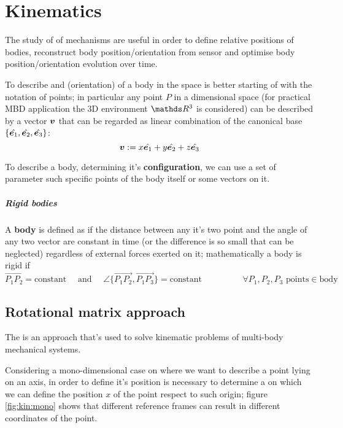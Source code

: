 \chapter{Kinematics}
	The study of  of mechanisms are useful in order to define relative positions of bodies, reconstruct body position/orientation from sensor and optimise body position/orientation evolution over time.
	
	To describe  and  (orientation) of a body in the space is better starting of with the notation of points; in particular any point $P$ in a dimensional space (for practical MBD application the 3D environment $\R^3$ is considered) can be described by a vector $\boldsymbol{v}$ that can be regarded as linear combination of the canonical base $\{\hat{\boldsymbol{e}_1},\hat{\boldsymbol{e}_2},\hat{\boldsymbol{e}_3}\}$:
	\begin{equation}
		\boldsymbol{v} := x \hat{\boldsymbol{e}_1} + y \hat{\boldsymbol{e}_2} + z \hat{\boldsymbol{e}_3}
	\end{equation}

	To describe a body, determining it's \textbf{configuration}, we can use a set of parameter such specific points of the body itself or some vectors on it.
	
	\paragraph{Rigid bodies} A \textbf{body} is defined as  if the distance between any it's two point and the angle of any two vector are constant in time (or the difference is so small that can be neglected) regardless of external forces exerted on it; mathematically a body is rigid if
	\begin{equation}
		\overrightarrow{P_1P_2} = \textrm{constant} \quad \textrm{ and } \quad \angle \{ \overrightarrow{P_1P_2},\overrightarrow{P_1P_3}\} = \textrm{constant} \hspace{2cm} \forall P_1, P_2, P_3 \textrm{ points} \in \textrm{body}
	\end{equation}

\section{Rotational matrix approach}
	The  is an approach that's used to solve kinematic problems of multi-body mechanical systems.
	
	Considering a mono-dimensional case on where we want to describe a point lying on an axis, in order to define it's position is necessary to determine a  on which we can define the position $x$ of the point respect to such origin; figure \ref{fig:kin:mono} shows that different reference frames can result in different coordinates of the point.
	
